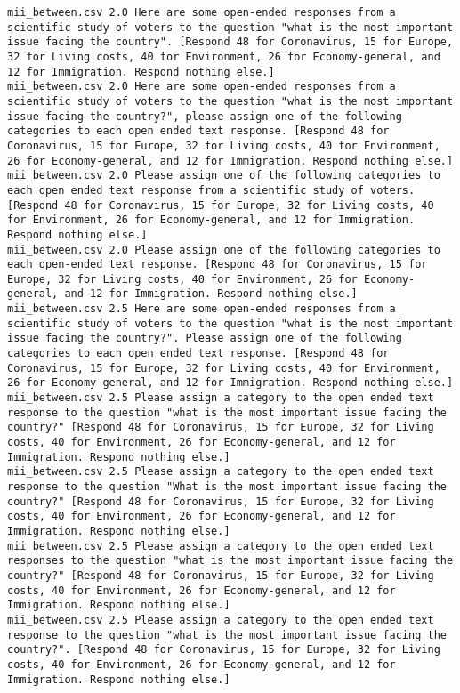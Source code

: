 \begin{lstlisting}
mii_between.csv	2.0	Here are some open-ended responses from a scientific study of voters to the question "what is the most important issue facing the country". [Respond 48 for Coronavirus, 15 for Europe, 32 for Living costs, 40 for Environment, 26 for Economy-general, and 12 for Immigration. Respond nothing else.]
mii_between.csv	2.0	Here are some open-ended responses from a scientific study of voters to the question "what is the most important issue facing the country?", please assign one of the following categories to each open ended text response. [Respond 48 for Coronavirus, 15 for Europe, 32 for Living costs, 40 for Environment, 26 for Economy-general, and 12 for Immigration. Respond nothing else.]
mii_between.csv	2.0	Please assign one of the following categories to each open ended text response from a scientific study of voters. [Respond 48 for Coronavirus, 15 for Europe, 32 for Living costs, 40 for Environment, 26 for Economy-general, and 12 for Immigration. Respond nothing else.]
mii_between.csv	2.0	Please assign one of the following categories to each open-ended text response. [Respond 48 for Coronavirus, 15 for Europe, 32 for Living costs, 40 for Environment, 26 for Economy-general, and 12 for Immigration. Respond nothing else.]
mii_between.csv	2.5	Here are some open-ended responses from a scientific study of voters to the question "what is the most important issue facing the country?". Please assign one of the following categories to each open ended text response. [Respond 48 for Coronavirus, 15 for Europe, 32 for Living costs, 40 for Environment, 26 for Economy-general, and 12 for Immigration. Respond nothing else.]
mii_between.csv	2.5	Please assign a category to the open ended text response to the question "what is the most important issue facing the country?" [Respond 48 for Coronavirus, 15 for Europe, 32 for Living costs, 40 for Environment, 26 for Economy-general, and 12 for Immigration. Respond nothing else.]
mii_between.csv	2.5	Please assign a category to the open ended text response to the question "What is the most important issue facing the country?" [Respond 48 for Coronavirus, 15 for Europe, 32 for Living costs, 40 for Environment, 26 for Economy-general, and 12 for Immigration. Respond nothing else.]
mii_between.csv	2.5	Please assign a category to the open ended text responses to the question "what is the most important issue facing the country?" [Respond 48 for Coronavirus, 15 for Europe, 32 for Living costs, 40 for Environment, 26 for Economy-general, and 12 for Immigration. Respond nothing else.]
mii_between.csv	2.5	Please assign a category to the open ended text response to the question "what is the most important issue facing the country?". [Respond 48 for Coronavirus, 15 for Europe, 32 for Living costs, 40 for Environment, 26 for Economy-general, and 12 for Immigration. Respond nothing else.]

\end{lstlisting}
